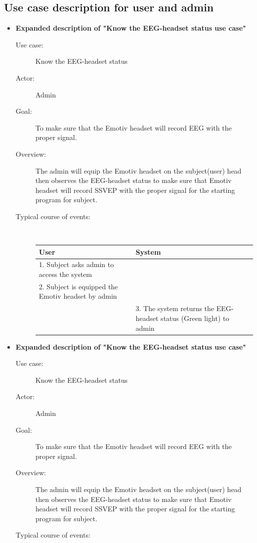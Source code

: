 \subsection{Use case description for user and admin}
\begin{itemize}
\item \textbf{Expanded description of "Know the EEG-headset status
use case" }

\begin{description}
\item [{Use case:}] Know the EEG-headset status 
\item [{Actor:}] Admin 
\item [{Goal:}] To make sure that the Emotiv headset will record EEG with
the proper signal. 
\item [{Overview:}] The admin will equip the Emotiv headset on the subject(user)
head then observes the EEG-headset status to make sure that Emotiv
headset will record SSVEP with the proper signal for the starting
program for subject. 
\item [{Typical course of events:}]~

{
	\centering

	\begin{tabular}{| m{.47\linewidth} | m{.47\linewidth} |}
		
	\hline 
	\textbf{User} & \textbf{System}  \tabularnewline
	\hline 
	1. Subject asks admin to access the system &   \tabularnewline
	\hline 
	2. Subject is equipped the Emotiv headset by admin  &   \tabularnewline
	\hline 
	 & 3. The system returns the EEG-headset status (Green light) to admin \tabularnewline
	 \hline 
	
	\end{tabular}
}

\end{description}
\item \textbf{Expanded description of "Know the EEG-headset status
	use case" }

\begin{description}
	\item [{Use case:}] Know the EEG-headset status 
	\item [{Actor:}] Admin 
	\item [{Goal:}] To make sure that the Emotiv headset will record EEG with
	the proper signal. 
	\item [{Overview:}] The admin will equip the Emotiv headset on the subject(user)
	head then observes the EEG-headset status to make sure that Emotiv
	headset will record SSVEP with the proper signal for the starting
	program for subject. 
	\item [{Typical course of events:}]~
	

\end{description}
\end{itemize}
